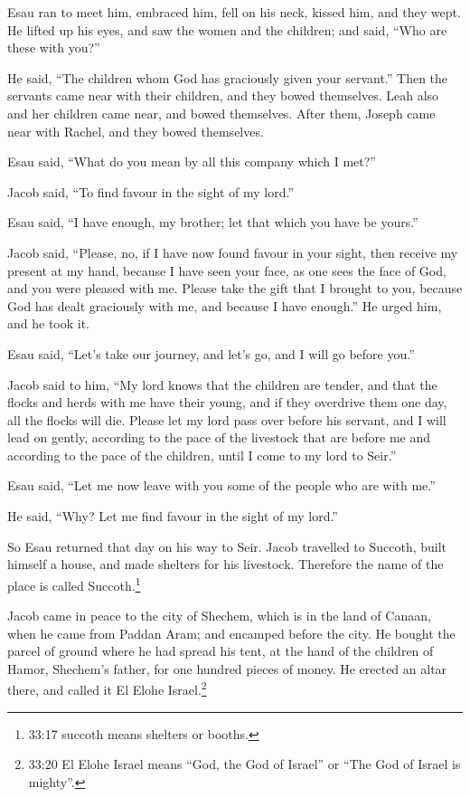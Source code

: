  Esau ran to meet him, embraced him, fell on his neck,
kissed him, and they wept.  He lifted up his eyes, and saw
the women and the children; and said, ``Who are these with you?''

He said, ``The children whom God has graciously given your servant.''
 Then the servants came near with their children, and they
bowed themselves.  Leah also and her children came near, and
bowed themselves. After them, Joseph came near with Rachel, and they
bowed themselves.

 Esau said, ``What do you mean by all this company which I
met?''

Jacob said, ``To find favour in the sight of my lord.''

 Esau said, ``I have enough, my brother; let that which you
have be yours.''

 Jacob said, ``Please, no, if I have now found favour in
your sight, then receive my present at my hand, because I have seen your
face, as one sees the face of God, and you were pleased with me.
 Please take the gift that I brought to you, because God
has dealt graciously with me, and because I have enough.'' He urged him,
and he took it.

 Esau said, ``Let's take our journey, and let's go, and I
will go before you.''

 Jacob said to him, ``My lord knows that the children are
tender, and that the flocks and herds with me have their young, and if
they overdrive them one day, all the flocks will die. 
Please let my lord pass over before his servant, and I will lead on
gently, according to the pace of the livestock that are before me and
according to the pace of the children, until I come to my lord to
Seir.''

 Esau said, ``Let me now leave with you some of the people
who are with me.''

He said, ``Why? Let me find favour in the sight of my lord.''

 So Esau returned that day on his way to Seir.
 Jacob travelled to Succoth, built himself a house, and
made shelters for his livestock. Therefore the name of the place is
called Succoth.\footnote{33:17 succoth means shelters or booths.}

 Jacob came in peace to the city of Shechem, which is in
the land of Canaan, when he came from Paddan Aram; and encamped before
the city.  He bought the parcel of ground where he had
spread his tent, at the hand of the children of Hamor, Shechem's father,
for one hundred pieces of money.  He erected an altar
there, and called it El Elohe Israel.\footnote{33:20 El Elohe Israel
  means ``God, the God of Israel'' or ``The God of Israel is mighty''.}

